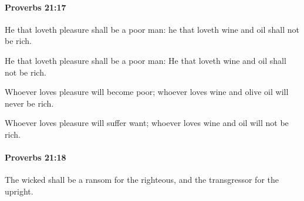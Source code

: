 		\paragraph{Proverbs 21:17} %
			\label{PROVERBS-21-17}

			He that loveth pleasure shall be a poor man: he that loveth wine and oil shall not be rich.

			\begin{versebox}
					\item[BHS] 
					\item[ASV] He that loveth pleasure shall be a poor man: He that loveth wine and oil shall not be rich.
					\item[NIV] Whoever loves pleasure will become poor; whoever loves wine and olive oil will never be rich.
					\item[NRSV] Whoever loves pleasure will suffer want; whoever loves wine and oil will not be rich.
			\end{versebox}

		\paragraph{Proverbs 21:18} %
			\label{PROVERBS-21-18}

			The wicked shall be a ransom for the righteous, and the transgressor for the upright.

